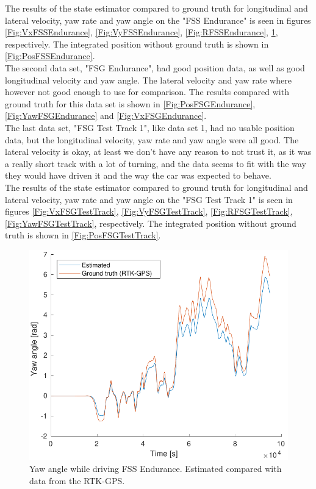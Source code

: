 The results of the state estimator compared to ground truth for longitudinal  and lateral velocity, yaw rate and yaw angle on the "FSS Endurance" is seen in figures \ref{Fig:VxFSSEndurance}, \ref{Fig:VyFSSEndurance}, \ref{Fig:RFSSEndurance}, \ref{Fig:YawFSSEndurance}, respectively. The integrated position without ground truth is shown in \ref{Fig:PosFSSEndurance}. \\

The second data set, "FSG Endurance", had good position data, as well as good longitudinal velocity and yaw angle. The lateral velocity and yaw rate where however not good enough to use for comparison. The results compared with ground truth for this data set is shown in \ref{Fig:PosFSGEndurance}, \ref{Fig:YawFSGEndurance} and \ref{Fig:VxFSGEndurance}. \\

The last data set, "FSG Test Track 1", like data set 1, had no usable position data, but the longitudinal velocity, yaw rate and yaw angle were all good. The lateral velocity is okay, at least we don't have any reason to not trust it, as it was a really short track with a lot of turning, and the data seems to fit with the way they would have driven it and the way the car was expected to behave. \\

The results of the state estimator compared to ground truth for longitudinal  and lateral velocity, yaw rate and yaw angle on the "FSG Test Track 1" is seen in figures \ref{Fig:VxFSGTestTrack}, \ref{Fig:VyFSGTestTrack}, \ref{Fig:RFSGTestTrack}, \ref{Fig:YawFSGTestTrack}, respectively. The integrated position without ground truth is shown in \ref{Fig:PosFSGTestTrack}. \\



\begin{figure}
    \centering
    \includegraphics[width=0.8\linewidth]{0_Images/6_Results/yawFSSEndurance.pdf}
    \caption[Yaw angle while driving FSS Endurance.]
    {Yaw angle while driving FSS Endurance. Estimated compared with data from the RTK-GPS.}
    \label{Fig:YawFSSEndurance}
\end{figure}


